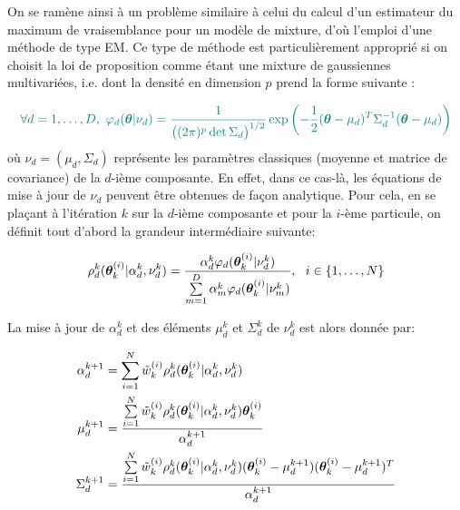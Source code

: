 On se ramène ainsi à un problème similaire à celui du calcul d'un estimateur du maximum de vraisemblance pour un modèle de mixture, d'où l'emploi d'une méthode de type EM. 
Ce type de méthode est particulièrement approprié si on choisit la loi de proposition comme étant une mixture de gaussiennes multivariées, i.e. dont la densité en dimension $p$ prend la forme suivante : 

\begin{equation}
\NdFS{
\forall d = 1, \dots, D, ~ \propFonc_d(\VecTheta|\nu_d) = \dfrac{1}{\bigl((2\pi)^p\det \Sigma_d\bigr)^{1/2}}\exp\left(-\dfrac{1}{2}(\VecTheta - \mu_d)^T \Sigma_d^{-1}(\VecTheta - \mu_d)\right)
\label{eq_def_multivariate_gaussian}
}
\end{equation}
où $\nu_d = (\mu_d, \Sigma_d)$ représente les paramètres classiques (moyenne et matrice de covariance) de la $d$-ième composante. En effet, dans ce cas-là, les équations de mise à jour de $\nu_d$ peuvent être obtenues de façon analytique. Pour cela, en se plaçant à l'itération $k$ sur la $d$-ième composante et pour la $i$-ème particule, on définit tout d'abord la grandeur intermédiaire suivante:

\begin{equation}
	\rho_d^k({\bm{\theta}}_k^{(i)} | \alpha_d^k , \nu_d^k) = \dfrac{\alpha_d^k \varphi_d({\bm{\theta}}_k^{(i)} | \nu_d^k)}{\sum\limits_{m=1}^D\alpha_m^k \varphi_d({\bm{\theta}}_k^{(i)} | \nu_m^k)}, ~~ i \in \{1, \dots, N\}
\end{equation}

La mise à jour de $\alpha_d^k$ et des éléments $\mu_d^k$ et $\Sigma_d^k$ de $\nu_d^k$ est alors donnée par:

\begin{equation}
\begin{split}
\alpha_d^{k+1}  &= \sum\limits_{i=1}^N \tilde{w}_k^{(i)} \rho_d^k({\bm{\theta}}_k^{(i)} | \alpha_d^k , \nu_d^k) \\
\mu_d^{k+1} &= \dfrac{\sum\limits_{i=1}^N\tilde{w}_k^{(i)} \rho_d^k({\bm{\theta}}_k^{(i)} | \alpha_d^k , \nu_d^k) {\bm{\theta}}_k^{(i)}}{\alpha_d^{k+1} } \\
\Sigma_d^{k+1} &= \dfrac{\sum\limits_{i=1}^N \tilde{w}_k^{(i)} \rho_d^k({\bm{\theta}}_k^{(i)} | \alpha_d^k , \nu_d^k)({\bm{\theta}}_k^{(i)} - \mu_d^{k+1})({\bm{\theta}}_k^{(i)} - \mu_d^{k+1})^T }{\alpha_d^{k+1}}
\end{split}
\label{eq_maj_gaussien}
\end{equation}


